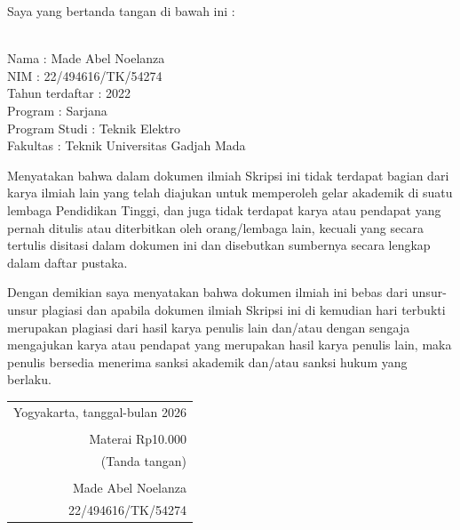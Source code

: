 \noindent Saya yang bertanda tangan di bawah ini :

\vspace{-1em}

\begin{tabbing}
\hspace{40mm} \= \\ %
\noindent Nama \> : Made Abel Noelanza \\[\parskip]
\noindent NIM \> : 22/494616/TK/54274 \\[\parskip]
\noindent Tahun terdaftar \> : 2022 \\[\parskip]
\noindent Program \> : Sarjana \\[\parskip]
\noindent Program Studi \> : Teknik Elektro \\[\parskip]
\noindent Fakultas \> : Teknik Universitas Gadjah Mada
\end{tabbing}

\noindent Menyatakan bahwa dalam dokumen ilmiah Skripsi ini tidak terdapat bagian dari karya ilmiah lain yang telah diajukan untuk memperoleh gelar akademik di suatu lembaga Pendidikan Tinggi, dan juga tidak terdapat karya atau pendapat yang pernah ditulis atau diterbitkan oleh orang/lembaga lain, kecuali yang secara tertulis disitasi dalam dokumen ini dan disebutkan sumbernya secara lengkap dalam daftar pustaka.

\noindent Dengan demikian saya menyatakan bahwa dokumen ilmiah ini bebas dari unsur-unsur plagiasi dan apabila dokumen ilmiah Skripsi ini di kemudian hari terbukti merupakan plagiasi dari hasil karya penulis lain dan/atau dengan sengaja mengajukan karya atau pendapat yang merupakan hasil karya penulis lain, maka penulis bersedia menerima sanksi akademik dan/atau sanksi hukum yang berlaku.


\begin{flushright}
	\begin{tabular}{r}
		Yogyakarta, tanggal-bulan 2026 \\
		\vspace{0.1cm} \\
		\tiny{Materai Rp10.000} \\
		\tiny{(Tanda tangan)} \\	
		\vspace{0.1cm} \\
		Made Abel Noelanza \\ 22/494616/TK/54274
	\end{tabular}
\end{flushright}